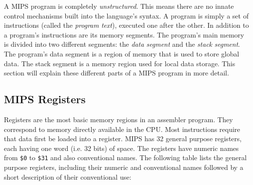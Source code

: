 \documentclass[12pt]{article}
\begin{document}
A MIPS program is completely \textit{unstructured}. This means there are no
     innate control mechanisms built into the language's syntax. A program is
     simply a set of instructions (called the \textit{program text}), executed
     one after the other. In addition to a program's instructions are its memory
     segments. The program's main memory is divided into two different segments:
     the \textit{data segment} and the \textit{stack segment}. The program's
     data segment is a region of memory that is used to store global data. The
     stack segment is a memory region used for local data storage. This section
     will explain these different parts of a MIPS program in more detail.

\subsection{MIPS Registers}

Registers are the most basic memory regions in an assembler program. They
     correspond to memory directly available in the CPU. Most instructions
     require that data first be loaded into a register. MIPS has 32 general
     purpose registers, each having one word (i.e. 32 bits) of space. The
     registers have numeric names from \texttt{\$0} to \texttt{\$31} and also
     conventional names. The following table lists the general purpose
     registers, including their numeric and conventional names followed by a
     short description of their conventional use:\\
\end{document}
